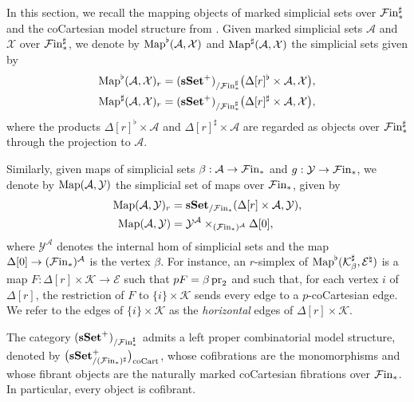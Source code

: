 \documentclass[10pt,reqno]{amsart}
\begin{document}
In this section, we recall the mapping objects of marked simplicial
sets over $\mathcal{F}\mathrm{in}_*^\sharp$ and the coCartesian model structure from
\cite[\S3.1.3]{lurie2009higher}. Given marked simplicial sets
$\mathcal A$ and $\mathcal X$ over $\mathcal{F}\mathrm{in}_*^\sharp$, we denote by
$\operatorname{Map}^\flat(\mathcal A,\mathcal X)$ and
$\operatorname{Map}^\sharp(\mathcal A,\mathcal X)$ the simplicial sets given by
\begin{equation}
\label{eq:marked_flat_mapping}
\begin{aligned}
\operatorname{Map}^\flat(\mathcal A,\mathcal X)_r
&=(\mathbf{sSet}^+)_{/\mathcal{F}\mathrm{in}_*^\sharp}
  \bigl(\Delta[r]^\flat\times\mathcal A,\mathcal X\bigr),\\
\operatorname{Map}^\sharp(\mathcal A,\mathcal X)_r
&=(\mathbf{sSet}^+)_{/\mathcal{F}\mathrm{in}_*^\sharp}
  \bigl(\Delta[r]^\sharp\times\mathcal A,\mathcal X\bigr),  
\end{aligned}
\end{equation}
where the products $\Delta[r]^\flat\times\mathcal A$ and
$\Delta[r]^\sharp\times\mathcal A$ are regarded as objects over
$\mathcal{F}\mathrm{in}_*^\sharp$ through the projection to $\mathcal A$.

Similarly, given maps of simplicial sets
$\beta:\mathcal A\to\mathcal{F}\mathrm{in}_*$ and $g:\mathcal Y\to\mathcal{F}\mathrm{in}_*$, we
denote by $\operatorname{Map}(\mathcal A,\mathcal Y)$ the simplicial set of maps
over $\mathcal{F}\mathrm{in}_*$, given by
\begin{equation}
\label{eq:unmarked_relative_mapping}
\begin{aligned}
\operatorname{Map}(\mathcal A,\mathcal Y)_r
 &=\mathbf{sSet}_{/\mathcal{F}\mathrm{in}_*}(\Delta[r]\times\mathcal A,\mathcal Y),\\
\operatorname{Map}(\mathcal A,\mathcal Y)
 &=\mathcal Y^{\mathcal A}
   \times_{(\mathcal{F}\mathrm{in}_*)^{\mathcal A}}\Delta[0],
\end{aligned}
\end{equation}
where $\mathcal Y^{\mathcal A}$ denotes the internal hom of
simplicial sets and the map $\Delta[0]\to(\mathcal{F}\mathrm{in}_*)^{\mathcal A}$ is
the vertex $\beta$. For instance, an $r$-simplex of
$\operatorname{Map}^\flat(\mathcal K^\sharp_\beta,\mathcal E^\natural)$
is a map $F:\Delta[r]\times\mathcal K\to\mathcal E$
such that $pF=\beta\operatorname{pr}_2$ and such that, for each vertex $i$ of
$\Delta[r]$, the restriction of $F$ to $\{i\}\times\mathcal K$
sends every edge to a $p$-coCartesian edge. We refer to the edges of
$\{i\}\times\mathcal K$ as the \emph{horizontal} edges of
$\Delta[r]\times\mathcal K$.

\begin{theorem}
\label{thm:cocartesian_model_structure}
The category $(\mathbf{sSet}^+)_{/\mathcal{F}\mathrm{in}_*^\sharp}$ admits a left proper
combinatorial model structure, denoted by $\bigl(\mathbf{sSet}^+_{/(\mathcal{F}\mathrm{in}_*)^\sharp}\bigr)_{\mathrm{coCart}}$, whose
cofibrations are the monomorphisms and whose fibrant objects are the
naturally marked coCartesian fibrations over $\mathcal{F}\mathrm{in}_*$. In
particular, every object is cofibrant.
\end{theorem}
\end{document}

